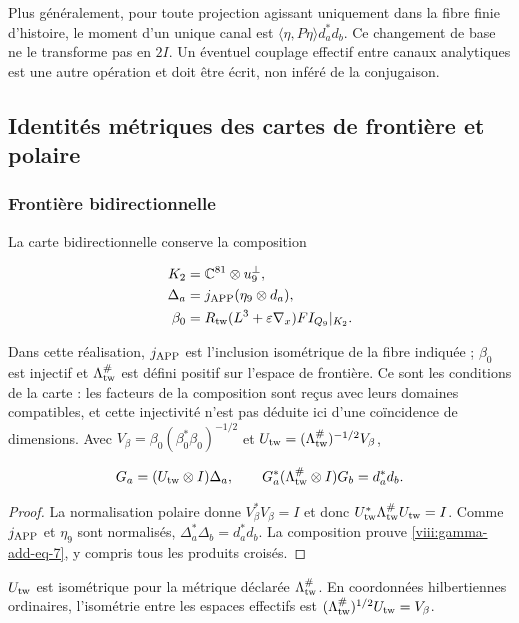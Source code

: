 Plus généralement, pour toute projection agissant uniquement dans la fibre finie d'histoire, le moment d'un unique canal est
\(\langle\eta,P\eta\rangle d_a^*d_b\). Ce changement de base ne le transforme pas en \(2I\). Un éventuel couplage effectif entre canaux analytiques est une autre opération et doit être écrit, non inféré de la conjugaison.

\subsection{Identités métriques des cartes de frontière et polaire}
\label{viii:gamma-add-sub-195}

\subsubsection{Frontière bidirectionnelle}
\label{viii:gamma-add-sub-197}

La carte bidirectionnelle conserve la composition

\begin{equation}
\begin{aligned}
K_2&=\mathbb C^{81}\otimes u_9^\perp,\\
\Delta_a&=j_{\rm APP}(\eta_9\otimes d_a),\\
\beta_0&=R_{\rm tw}(L^3+\varepsilon\nabla_x)FI_{Q_9}|_{K_2}.
\end{aligned}
\label{viii:gamma-add-display-16}
\end{equation}

Dans cette réalisation, \(j_{\rm APP}\) est l'inclusion isométrique de la fibre indiquée ; \(\beta_0\) est injectif et \(\Lambda_{\rm tw}^{\#}\) est défini positif sur l'espace de frontière. Ce sont les conditions de la carte : les facteurs de la composition sont reçus avec leurs domaines compatibles, et cette injectivité n'est pas déduite ici d'une coïncidence de dimensions.
Avec \(V_\beta=\beta_0(\beta_0^*\beta_0)^{-1/2}\) et
\(U_{\rm tw}=(\Lambda_{\rm tw}^{\#})^{-1/2}V_\beta\),

\begin{equation}
G_a=(U_{\rm tw}\otimes I)\Delta_a,\qquad
G_a^*(\Lambda_{\rm tw}^{\#}\otimes I)G_b=d_a^*d_b.
\label{viii:gamma-add-eq-7}
\end{equation}

\begin{proof}
La normalisation polaire donne \(V_\beta^*V_\beta=I\) et donc
\(U_{\rm tw}^*\Lambda_{\rm tw}^{\#}U_{\rm tw}=I\).
Comme \(j_{\rm APP}\) et \(\eta_9\) sont normalisés,
\(\Delta_a^*\Delta_b=d_a^*d_b\). La composition prouve
\eqref{viii:gamma-add-eq-7}, y compris tous les produits croisés.
\end{proof}
\(U_{\rm tw}\) est isométrique pour la métrique déclarée
\(\Lambda_{\rm tw}^{\#}\). En coordonnées hilbertiennes ordinaires,
l'isométrie entre les espaces effectifs est
\((\Lambda_{\rm tw}^{\#})^{1/2}U_{\rm tw}=V_\beta\).

